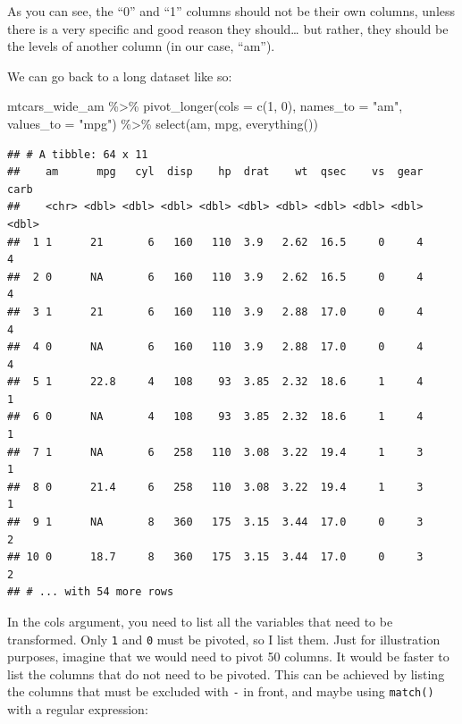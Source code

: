 \documentclass[
]{article}
\newenvironment{Shaded}{\begin{snugshade}}{\end{snugshade}}
\newcommand{\AttributeTok}[1]{\textcolor[rgb]{0.77,0.63,0.00}{#1}}
\newcommand{\FunctionTok}[1]{\textcolor[rgb]{0.00,0.00,0.00}{#1}}
\newcommand{\NormalTok}[1]{#1}
\newcommand{\SpecialCharTok}[1]{\textcolor[rgb]{0.00,0.00,0.00}{#1}}
\newcommand{\StringTok}[1]{\textcolor[rgb]{0.31,0.60,0.02}{#1}}
\begin{document}
As you can see, the ``0'' and ``1'' columns should not be their own columns, unless there is a very
specific and good reason they should\ldots{} but rather, they should be the levels of another column (in
our case, ``am'').

We can go back to a long dataset like so:

\begin{Shaded}
\begin{Highlighting}[]
\NormalTok{mtcars\_wide\_am }\SpecialCharTok{\%\textgreater{}\%} 
  \FunctionTok{pivot\_longer}\NormalTok{(}\AttributeTok{cols =} \FunctionTok{c}\NormalTok{(}\StringTok{\textasciigrave{}}\AttributeTok{1}\StringTok{\textasciigrave{}}\NormalTok{, }\StringTok{\textasciigrave{}}\AttributeTok{0}\StringTok{\textasciigrave{}}\NormalTok{), }\AttributeTok{names\_to =} \StringTok{"am"}\NormalTok{, }\AttributeTok{values\_to =} \StringTok{"mpg"}\NormalTok{) }\SpecialCharTok{\%\textgreater{}\%} 
  \FunctionTok{select}\NormalTok{(am, mpg, }\FunctionTok{everything}\NormalTok{())}
\end{Highlighting}
\end{Shaded}

\begin{verbatim}
## # A tibble: 64 x 11
##    am      mpg   cyl  disp    hp  drat    wt  qsec    vs  gear  carb
##    <chr> <dbl> <dbl> <dbl> <dbl> <dbl> <dbl> <dbl> <dbl> <dbl> <dbl>
##  1 1      21       6   160   110  3.9   2.62  16.5     0     4     4
##  2 0      NA       6   160   110  3.9   2.62  16.5     0     4     4
##  3 1      21       6   160   110  3.9   2.88  17.0     0     4     4
##  4 0      NA       6   160   110  3.9   2.88  17.0     0     4     4
##  5 1      22.8     4   108    93  3.85  2.32  18.6     1     4     1
##  6 0      NA       4   108    93  3.85  2.32  18.6     1     4     1
##  7 1      NA       6   258   110  3.08  3.22  19.4     1     3     1
##  8 0      21.4     6   258   110  3.08  3.22  19.4     1     3     1
##  9 1      NA       8   360   175  3.15  3.44  17.0     0     3     2
## 10 0      18.7     8   360   175  3.15  3.44  17.0     0     3     2
## # ... with 54 more rows
\end{verbatim}

In the cols argument, you need to list all the variables that need to be transformed. Only \texttt{1} and
\texttt{0} must be pivoted, so I list them. Just for illustration purposes, imagine that we would need
to pivot 50 columns. It would be faster to list the columns that do not need to be pivoted. This
can be achieved by listing the columns that must be excluded with \texttt{-} in front, and maybe using
\texttt{match()} with a regular expression:
\end{document}
